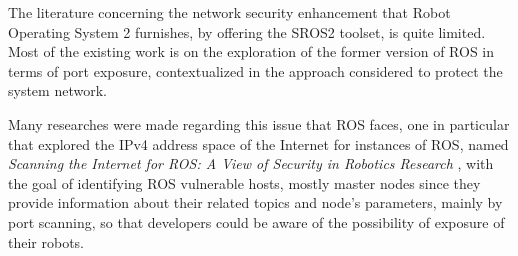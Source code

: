 
The literature concerning the network security enhancement that Robot Operating System 2 furnishes, by offering the SROS2 toolset, is quite limited. Most of the existing work is on the exploration of the former version of ROS in terms of port exposure, contextualized in the approach considered to protect the system network.  

Many researches were made regarding this issue that ROS faces, one in particular that explored the IPv4 address space of the Internet for instances of ROS, named \textit{Scanning the Internet for ROS: A View of Security in Robotics Research} \cite{8794451}, with the goal of identifying ROS vulnerable hosts, mostly master nodes since they provide information about their related topics and node's parameters, mainly by port scanning, so that developers could be aware of the possibility of exposure of their robots. %


